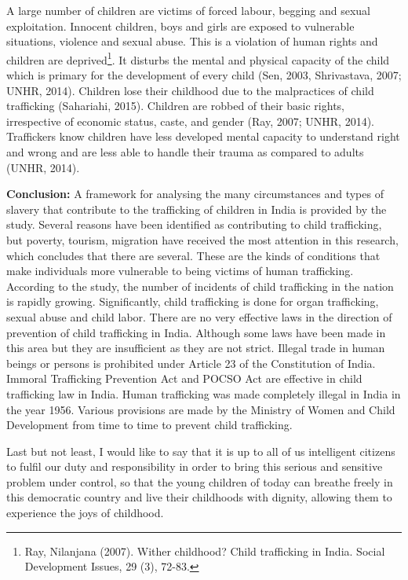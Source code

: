 \begin{multicols}{2}
\noi
A large number of children are victims of forced labour, begging and sexual exploitation. Innocent children, boys and girls are exposed to vulnerable situations, violence and sexual abuse. This is a violation of human rights and children are deprived\footnote{Ray, Nilanjana (2007). Wither childhood? Child trafficking in India. Social Development Issues, 29 (3), 72-83.}. It disturbs the mental and physical capacity of the child which is primary for the development of every child (Sen, 2003, Shrivastava, 2007; UNHR, 2014). Children lose their childhood due to the malpractices of child trafficking (Sahariahi, 2015). Children are robbed of their basic rights, irrespective of economic status, caste, and gender (Ray, 2007; UNHR, 2014). Traffickers know children have less developed mental capacity to understand right and wrong and are less able to handle their trauma as compared to adults (UNHR, 2014).

\noi
\textbf{Conclusion:} A framework for analysing the many circumstances and types of slavery that contribute to the trafficking of children in India is provided by the study. Several reasons have been identified as contributing to child trafficking, but poverty, tourism, migration have received the most attention in this research, which concludes that there are several. These are the kinds of conditions that make individuals more vulnerable to being victims of human trafficking. According to the study, the number of incidents of child trafficking in the nation is rapidly growing. Significantly, child trafficking is done for organ trafficking, sexual abuse and child labor. There are no very effective laws in the direction of prevention of child trafficking in India. Although some laws have been made in this area but they are insufficient as they are not strict. Illegal trade in human beings or persons is prohibited under Article 23 of the Constitution of India. Immoral Trafficking Prevention Act and POCSO Act are effective in child trafficking law in India. Human trafficking was made completely illegal in India in the year 1956. Various provisions are made by the Ministry of Women and Child Development from time to time to prevent child trafficking. 

\noi
Last but not least, I would like to say that it is up to all of us intelligent citizens to fulfil our duty and responsibility in order to bring this serious and sensitive problem under control, so that the young children of today can breathe freely in this democratic country and live their childhoods with dignity, allowing them to experience the joys of childhood.

\end{multicols}
\label{end2016-art5}

